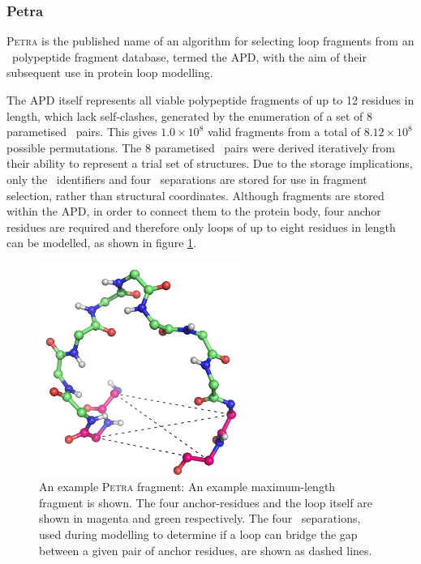 \subsubsection{Petra}

\textsc{Petra} is the published name of an algorithm for selecting loop fragments from an \abinitio\ polypeptide fragment database, termed the APD, with the aim of their subsequent use in protein loop modelling. 

The APD itself represents all viable polypeptide fragments of up to 12 residues in length, which lack self-clashes, generated by the enumeration of a set of 8 parametised \phipsi\ pairs. This gives $1.0 \times 10^8$ valid fragments from a total of $8.12 \times 10^8$ possible permutations. The  8 parametised \phipsi\ pairs were derived iteratively from their ability to represent a trial set of structures. Due to the storage implications,
only the \phipsi\ identifiers and four \ca\ separations are stored for use in fragment selection, rather than structural coordinates. Although  fragments are stored
within the APD,
in order to connect them to the protein body, four anchor residues are required
and therefore only loops of up to eight residues in length can be modelled,
as shown in figure \ref{fig:methcomp:petrafrag}.

\begin{figure}[hp]
\begin{center}
\includegraphics[width=0.6\textwidth]{./08-MethodComparison/petra/1A73A_97_12.png}
\caption[A Petra fragment]{An example \textsc{Petra} fragment: An example maximum-length  fragment is shown. The four anchor-residues and the  loop itself are shown in magenta and green
respectively. The four \ca\ separations, used during modelling to determine if a loop can bridge the gap between a given pair of anchor residues, are shown as
dashed lines.}
\label{fig:methcomp:petrafrag}
\end{center}
\end{figure}



